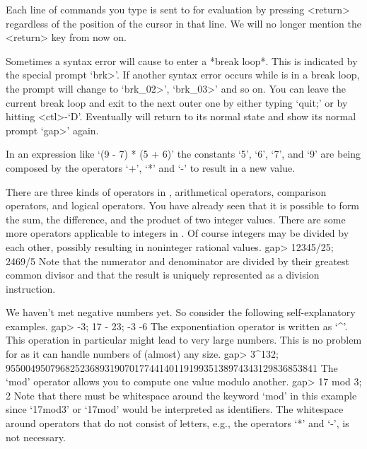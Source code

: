 Each line  of commands  you  type is sent to    {\GAP} for evaluation  by
pressing <return> regardless of the position of  the cursor in that line.
We will no longer mention the <return> key from now on.

Sometimes a syntax error will cause {\GAP} to enter a *break loop*.  This
is indicated by the special prompt `brk>'. If another syntax error occurs
while  {\GAP} is in  a break loop, the prompt  will  change to `brk_02>',
`brk_03>' and so on. You can leave the current break loop and exit to the
next outer one by either typing `quit;' or by hitting <ctl>-`D'.
Eventually {\GAP} will return to its normal state and show its normal
prompt `gap>' again.

\null

In an  expression like `(9  - 7) * (5 +  6)' the constants `5', `6', `7',
and `9' are being composed by the operators `+', `*' and `-' to result in
a new value.

There are  three kinds  of operators in  {\GAP}, arithmetical  operators,
comparison operators, and logical operators.  You  have already seen that
it is possible to form  the sum,  the  difference, and the product of two
integer values.  There are some  more operators applicable to integers in
{\GAP}.   Of  course integers  may  be divided  by  each other,  possibly
resulting in noninteger rational values.
\beginexample
gap> 12345/25;
2469/5
\endexample
Note  that  the numerator and denominator  are divided by their  greatest
common divisor  and that the result is uniquely represented as a division
instruction.

We     haven't met negative numbers      yet.  So consider the  following
self-explanatory examples.
\beginexample
gap> -3; 17 - 23;
-3
-6
\endexample
The exponentiation   operator  is  written  as  `^'. This   operation  in
particular might lead  to  very large numbers.  This  is  no problem  for
{\GAP} as it can handle numbers of (almost) any size.
\beginexample
gap> 3^132;
955004950796825236893190701774414011919935138974343129836853841
\endexample
The `mod' operator allows you to compute one value modulo another.
\beginexample
gap> 17 mod 3;
2
\endexample
Note  that  there must be   whitespace around the  keyword  `mod' in this
example since `17mod3' or `17mod' would be interpreted as identifiers.
The whitespace around operators that do not consist of letters, e.g.,
the operators `*' and `-', is not necessary.

